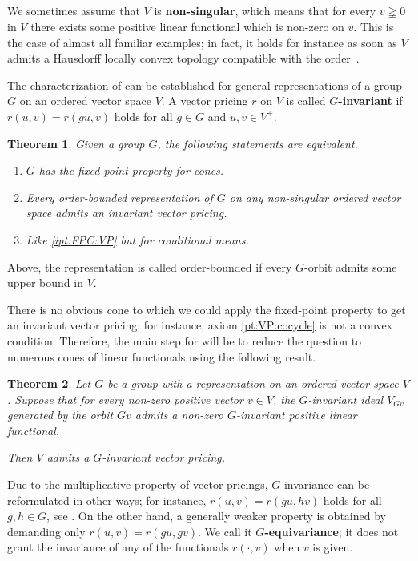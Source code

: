 \documentclass[11pt]{amsart}
\numberwithin{equation}{section}
\newtheorem{ithm}{Theorem}
\theoremstyle{definition}
\theoremstyle{definition}
\begin{document}
We sometimes assume that $V$ is \textbf{non-singular}, which means that for every $v\gneqq 0$ in $V$ there exists some positive linear functional which is non-zero on $v$. This is the case of almost all familiar examples; in fact, it holds for instance as soon as $V$ admits a Hausdorff locally convex topology compatible with the order~\cite[V.4.1]{Schaefer}.

The characterization of  can be established for general representations of a group $G$ on an ordered vector space $V$. A vector pricing $r$ on $V$ is called \textbf{$G$-invariant} if $r(u,v) = r(g u, v)$ holds for all $g\in G$ and $u,v\in V^+$.

\begin{ithm}\label{ithm:FPC-abstract}
Given a group $G$, the following statements are equivalent.
\begin{enumerate}[label=\normalfont(\roman*)]
\item $G$ has the fixed-point property for cones.\label{ipt:FPC:FPC}
\item Every order-bounded representation of $G$ on any non-singular ordered vector space admits an invariant vector pricing. \label{ipt:FPC:VP}
\item Like \ref{ipt:FPC:VP} but for conditional means. \label{ipt:FPC:CM}
\end{enumerate}
\end{ithm}

Above, the representation is called order-bounded if every $G$-orbit admits some upper bound in $V$.

\medskip
There is no obvious cone to which we could apply the fixed-point property to get an invariant vector pricing; for instance, axiom \ref{pt:VP:cocycle} is not a convex condition. Therefore, the main step for  will be to reduce the question to numerous cones of linear functionals using the following result.

\begin{ithm}\label{ithm:invariant-VP}
Let $G$ be a group with a representation on an ordered vector space $V$. Suppose that for every non-zero positive vector $v \in V$, the $G$-invariant ideal $V_{G v}$ generated by the orbit $Gv$ admits a non-zero $G$-invariant positive linear functional.

Then $V$ admits a $G$-invariant vector pricing. 
\end{ithm}

Due to the multiplicative property of vector pricings, $G$-invariance can be reformulated in other ways; for instance, $r(u,v) = r(g u, h v)$ holds for all $g,h\in G$, see . On the other hand, a generally weaker property is obtained by demanding only $r(u,v) = r(g u, g v)$. We call it \textbf{$G$-equivariance}; it does not grant the invariance of any of the functionals $r(\cdot, v)$ when $v$ is given.
\end{document}

